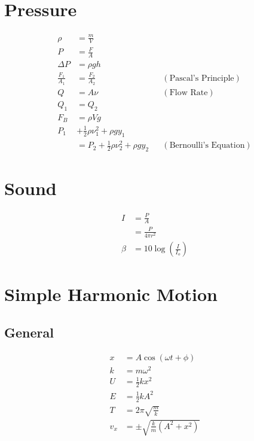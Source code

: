 \documentclass[10pt]{article}
\begin{document}
\begin{multicols*}{4}
\section{Pressure}

\begin{align*}
    \rho &= \frac{m}{V}\\
    P &= \frac{F}{A}\\
    \Delta P &= \rho gh\\
    \frac{F_1}{A_1} &= \frac{F_2}{A_2} && (\text{Pascal's
	Principle})\\
    Q &= A\nu && (\text{Flow Rate})\\
    Q_1 &= Q_2\\
    F_B &= \rho Vg\\
    P_1 &+ \frac{1}{2}\rho \nu_1^2 + \rho gy_1\\
	&= P_2 + \frac{1}{2}\rho \nu_2^2 + \rho gy_2 &&
	(\text{Bernoulli's Equation})
\end{align*}

\section{Sound}

\begin{align*}
    I &= \frac{P}{A}\\
      &= \frac{P}{4\pi r^2}\\
    \beta &= 10 \log \left({\frac{I}{I_o}}\right)
\end{align*}

\section{Simple Harmonic Motion}
\vspace{2ex}
\subsection{General}

\begin{align*}
    x &= A \cos (\omega t + \phi)\\
    k &= m\omega^2\\
    U &= \tfrac{1}{2} kx^2\\
    E &= \tfrac{1}{2} kA^2\\
    T &= 2\pi \sqrt{\frac{m}{k}}\\
    v_x &= \pm \sqrt{\tfrac{k}{m} (A^2 + x^2)}
\end{align*}


\end{multicols*}
\end{document}
